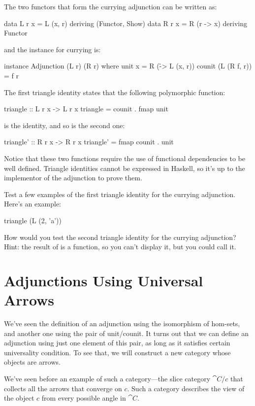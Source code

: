 \documentclass[DaoFP]{subfiles}
\begin{document}
The two functors that form the currying adjunction can be written as:
\begin{haskell}
data L r x = L (x, r)    deriving (Functor, Show)
data R r x = R (r -> x)  deriving Functor
\end{haskell}
and the  instance for currying is:
\begin{haskell}
instance Adjunction (L r) (R r) where
  unit x = R (\r -> L (x, r)) 
  counit (L (R f, r)) = f r
\end{haskell}
The first triangle identity states that the following polymorphic function:
\begin{haskell}
triangle :: L r x -> L r x
triangle = counit . fmap unit
\end{haskell}
is the identity, and so is the second one: 
\begin{haskell}
triangle' :: R r x -> R r x
triangle' = fmap counit . unit
\end{haskell}
Notice that these two functions require the use of functional dependencies to be well defined. Triangle identities cannot be expressed in Haskell, so it's up to the implementor of the adjunction to prove them.
\begin{exercise}
Test a few examples of the first triangle identity for the currying adjunction. Here's an example:
\begin{haskell}
triangle (L (2, 'a'))
\end{haskell}
\end{exercise}

\begin{exercise}
How would you test the second triangle identity for the currying adjunction? Hint: the result of  is a function, so you can't display it, but you could call it.
\end{exercise}

\section{Adjunctions Using Universal Arrows}

We've seen the definition of an adjunction using the isomorphism of hom-sets, and another one using the pair of unit/counit. It turns out that we can define an adjunction using just one element of this pair, as long as it satisfies certain universality condition. To see that, we will construct a new category whose objects are arrows. 

We've seen before an example of such a category---the slice category $\cat C/ c$ that collects all the arrows that converge on $c$. Such a category describes the view of the object $c$ from every possible angle in $\cat C$. 
\end{document}
